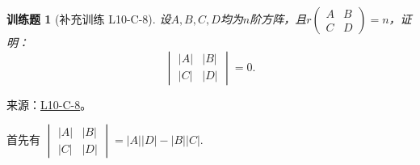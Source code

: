 \documentclass[UTF8,12pt,a4paper,fontset=fandol]{ctexart}
\newtheorem{exercise}{训练题}[section]
\begin{document}
\begin{exercise}[补充训练 L10-C-8]\label{prob:L10-C-8}
设$A,B,C,D$均为$n$阶方阵，且$r\begin{pmatrix}
                A & B \\ C & D
            \end{pmatrix}=n$，证明：
        \[\begin{vmatrix}
                |A| & |B| \\ |C| & |D|
            \end{vmatrix} = 0.\]
\end{exercise}
\noindent 来源：\href{https://github.com/yhwu-is/Linear-Algebra-Left-Undone/blob/new/%E8%AE%B2%E4%B9%89/%E4%B8%93%E9%A2%98/10%20%E8%A1%8C%E5%88%97%E5%BC%8F.tex}{L10-C-8}。
\begin{solve}
首先有 $\begin{vmatrix}
                \lvert A \rvert & \lvert B \rvert \\
                \lvert C \rvert & \lvert D \rvert
            \end{vmatrix} = \lvert A \rvert \lvert D \rvert-\lvert B \rvert \lvert C \rvert$.
\end{solve}
\end{document}
